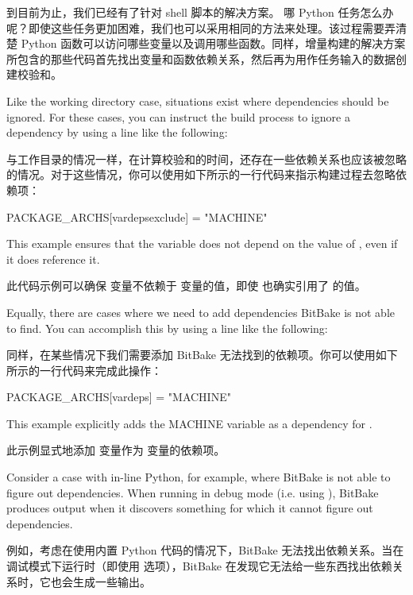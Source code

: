 到目前为止，我们已经有了针对 shell 脚本的解决方案。 哪 Python 任务怎么办呢？即使这些任务更加困难，我们也可以采用相同的方法来处理。该过程需要弄清楚 Python 函数可以访问哪些变量以及调用哪些函数。同样，增量构建的解决方案所包含的那些代码首先找出变量和函数依赖关系，然后再为用作任务输入的数据创建校验和。

Like the working directory case, situations exist where dependencies should be ignored. For these cases, you can instruct the build process to ignore a dependency by using a line like the following:

与工作目录的情况一样，在计算校验和的时间，还存在一些依赖关系也应该被忽略的情况。对于这些情况，你可以使用如下所示的一行代码来指示构建过程去忽略依赖项：

\begin{pyglist}
PACKAGE_ARCHS[vardepsexclude] = "MACHINE"
\end{pyglist}

This example ensures that the  variable does not depend on the value of , even if it does reference it.

此代码示例可以确保  变量不依赖于  变量的值，即使  也确实引用了  的值。

Equally, there are cases where we need to add dependencies BitBake is not able to find. You can accomplish this by using a line like the following:

同样，在某些情况下我们需要添加 BitBake 无法找到的依赖项。你可以使用如下所示的一行代码来完成此操作：

\begin{pyglist}
PACKAGE_ARCHS[vardeps] = "MACHINE"
\end{pyglist}

This example explicitly adds the MACHINE variable as a dependency for .

此示例显式地添加  变量作为  变量的依赖项。

Consider a case with in-line Python, for example, where BitBake is not able to figure out dependencies. When running in debug mode (i.e. using ), BitBake produces output when it discovers something for which it cannot figure out dependencies.

例如，考虑在使用内置 Python 代码的情况下，BitBake 无法找出依赖关系。当在调试模式下运行时（即使用  选项），BitBake 在发现它无法给一些东西找出依赖关系时，它也会生成一些输出。

